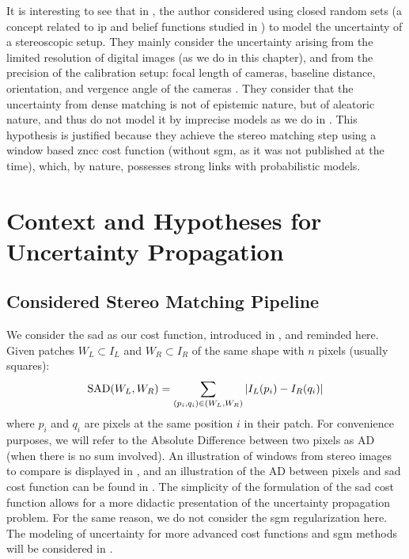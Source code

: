 \begin{remark}
    It is interesting to see that in \cite{quinio_random_1991,quinio_random_1992}, the author considered using closed random sets (a concept related to \acrfull{ip} and belief functions studied in ) to model the uncertainty of a stereoscopic setup. They mainly consider the uncertainty arising from the limited resolution of digital images (as we do in this chapter), and from the precision of the calibration setup: focal length of cameras, baseline distance, orientation, and vergence angle of the cameras \etc. They consider that the uncertainty from dense matching is not of epistemic nature, but of aleatoric nature, and thus do not model it by imprecise models as we do in . This hypothesis is justified because they achieve the stereo matching step using a window based \acrshort{zncc} cost function (without \acrshort{sgm}, as it was not published at the time), which, by nature, possesses strong links with probabilistic models.
\end{remark}

\section{Context and Hypotheses for Uncertainty Propagation }\label{sec:sources_of_uncertainty}
\subsection{Considered Stereo Matching Pipeline}
We consider the \acrfull{sad} as our cost function, introduced in , and reminded here. Given patches $W_L\subset I_L$ and $W_R\subset I_R$ of the same shape with $n$ pixels (usually squares):
\begin{align}
    \mathrm{SAD}(W_L, W_R) = \sum_{(p_i, q_i)\in (W_L, W_R)}|I_L(p_i) - I_R(q_i)|\label{eq:SAD}
\end{align}
where $p_i$ and $q_i$ are pixels at the same position $i$ in their patch. For convenience purposes, we will refer to the Absolute Difference between two pixels as AD (when there is no sum involved). An illustration of windows from stereo images to compare is displayed in , and an illustration of the AD between pixels and \acrshort{sad} cost function can be found in . The simplicity of the formulation of the \acrshort{sad} cost function allows for a more didactic presentation of the uncertainty propagation problem. For the same reason, we do not consider the \acrshort{sgm} regularization here. The modeling of uncertainty for more advanced cost functions and \acrshort{sgm} methods will be considered in .

